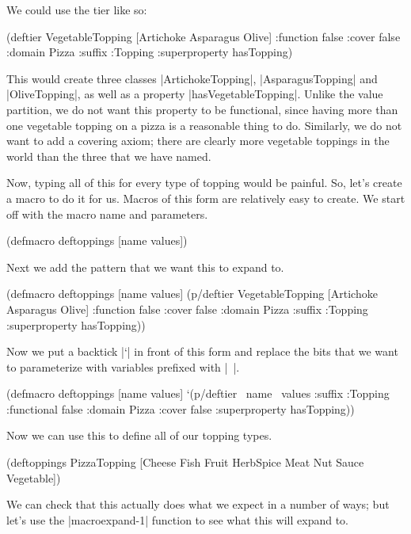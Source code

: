 We could use the tier like so:

\begin{tawnyexample}
(deftier VegetableTopping
  [Artichoke Asparagus Olive]
  :function false :cover false :domain Pizza :suffix :Topping
  :superproperty hasTopping)
\end{tawnyexample}

This would create three classes |ArtichokeTopping|, |AsparagusTopping|
and |OliveTopping|, as well as a property
|hasVegetableTopping|. Unlike the value partition, we do not want this
property to be functional, since having more than one vegetable
topping on a pizza is a reasonable thing to do. Similarly, we do not
want to add a covering axiom; there are clearly more vegetable
toppings in the world than the three that we have named.

Now, typing all of this for every type of topping would be
painful. So, let's create a macro to do it for us. Macros of this
form are relatively easy to create. We start off with the macro name
and parameters.

\begin{tawnyexample}
(defmacro deftoppings
   [name values])
\end{tawnyexample}

Next we add the pattern that we want this to expand to.

\begin{tawnyexample}
(defmacro deftoppings
   [name values]
  (p/deftier VegetableTopping
    [Artichoke Asparagus Olive]
    :function false :cover false :domain Pizza :suffix :Topping
    :superproperty hasTopping))
\end{tawnyexample}

Now we put a backtick |`| in front of this form and replace the bits
that we want to parameterize with variables prefixed with |~|.

\begin{tawny}
(defmacro deftoppings
  [name values]
  `(p/deftier ~name ~values
     :suffix :Topping
     :functional false
     :domain Pizza
     :cover false
     :superproperty hasTopping))
\end{tawny}

Now we can use this to define all of our topping types.

\begin{tawny}
(deftoppings PizzaTopping
  [Cheese Fish Fruit HerbSpice Meat Nut Sauce Vegetable])
\end{tawny}

We can check that this actually does what we expect in a number of
ways; but let's use the |macroexpand-1| function to see what this will
expand to.

